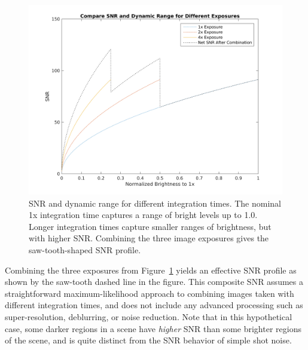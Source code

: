 \documentclass[]{spieman}  %
\begin{document}
\begin{figure}
  \centering
  \includegraphics[width=\columnwidth]{figures/hdr-design-snr-hdr-examples.png}
  \caption{SNR and dynamic range for different integration times. The nominal 1x integration time captures a range of bright levels up to 1.0.  Longer integration times capture smaller ranges of brightness, but with higher SNR. Combining the three image exposures gives the saw-tooth-shaped SNR profile. \label{fig:hdr_snr_example}}
\end{figure}

Combining the three exposures from Figure~\ref{fig:hdr_snr_example} yields an effective SNR profile as shown by the saw-tooth dashed line in the figure. This composite SNR assumes a straightforward maximum-likelihood approach to combining images taken with different integration times, and does not include any advanced processing such as super-resolution, deblurring, or noise reduction. Note that in this hypothetical case, some darker regions in a scene have \emph{higher} SNR than some brighter regions of the scene, and is quite distinct from the SNR behavior of simple shot noise.
\end{document}
